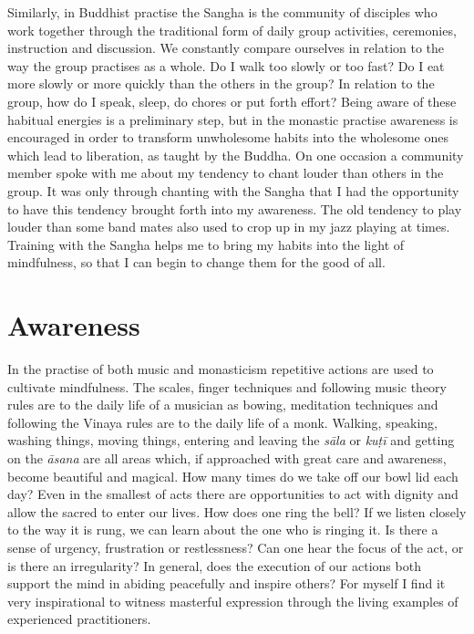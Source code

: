Similarly, in Buddhist practise the Sangha is the community of disciples
who work together through the traditional form of daily group
activities, ceremonies, instruction and discussion. We constantly
compare ourselves in relation to the way the group practises as a whole. 
Do I walk too slowly or too fast? Do I eat more slowly or more quickly
than the others in the group? In relation to the group, how do I speak, 
sleep, do chores or put forth effort? Being aware of these habitual
energies is a preliminary step, but in the monastic practise awareness
is encouraged in order to transform unwholesome habits into the
wholesome ones which lead to liberation, as taught by the Buddha. On one
occasion a community member spoke with me about my tendency to chant
louder than others in the group. It was only through chanting with the
Sangha that I had the opportunity to have this tendency brought forth
into my awareness. The old tendency to play louder than some band mates
also used to crop up in my jazz playing at times. Training with the
Sangha helps me to bring my habits into the light of mindfulness, so
that I can begin to change them for the good of all. 

\section{Awareness}

In the practise of both music and monasticism repetitive actions are
used to cultivate mindfulness. The scales, finger techniques and
following music theory rules are to the daily life of a musician as
bowing, meditation techniques and following the Vinaya rules are to the
daily life of a monk. Walking, speaking, washing things, moving things, 
entering and leaving the \emph{sāla} or \emph{kuṭī} and getting on the
\emph{āsana} are all areas which, if approached with great care and
awareness, become beautiful and magical. How many times do we take off
our bowl lid each day? Even in the smallest of acts there are
opportunities to act with dignity and allow the sacred to enter our
lives. How does one ring the bell? If we listen closely to the way it is
rung, we can learn about the one who is ringing it. Is there a sense of
urgency, frustration or restlessness? Can one hear the focus of the act, 
or is there an irregularity? In general, does the execution of our
actions both support the mind in abiding peacefully and inspire others? 
For myself I find it very inspirational to witness masterful expression
through the living examples of experienced practitioners. 

